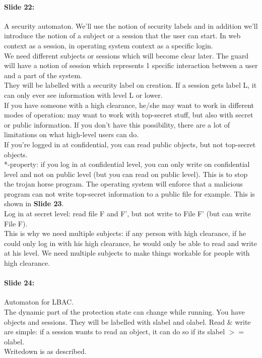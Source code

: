 \documentclass[10pt,a4paper]{report}
\begin{document}
\paragraph{Slide 22:} A security automaton. We'll use the notion of security labels and in addition we'll introduce the notion of a subject or a session that the user can start. In web context as a session, in operating system context as a specific login.\\
We need different subjects or sessions which will become clear later. The guard will have a notion of session which represents 1 specific interaction between a user and a part of the system. \\
They will be labelled with a security label on creation. If a session gets label L, it can only ever see information with level L or lower.\\
If you have someone with a high clearance, he/she may want to work in different modes of operation: may want to work with top-secret stuff, but also with secret or public information. If you don't have this possibility, there are a lot of limitations on what high-level users can do.\\
If you're logged in at confidential, you can read public objects, but not top-secret objects.\\
*-property: if you log in at confidential level, you can only write on confidential level and not on public level (but you can read on public level). This is to stop the trojan horse program. The operating system will enforce that a malicious program can not write top-secret information to a public file for example. This is shown in \textbf{Slide 23}.\\
Log in at secret level: read file F and F', but not write to File F' (but can write File F).\\
This is why we need multiple subjects: if any person with high clearance, if he could only log in with his high clearance, he would only be able to read and write at his level. We need multiple subjects to make things workable for people with high clearance.

\paragraph{Slide 24:} Automaton for LBAC. \\
The dynamic part of the protection state can change while running. You have objects and sessions. They will be labelled with slabel and olabel. Read $\&$ write are simple: if a session wants to read an object, it can do so if its slabel $>=$ olabel.\\
Writedown is as described.
\end{document}
